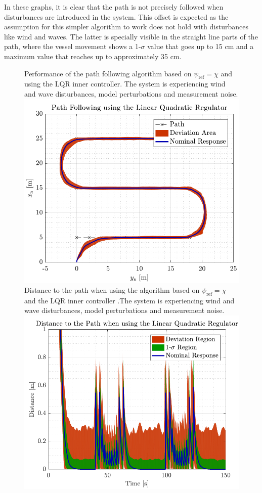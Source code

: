 In these graphs, it is clear that the path is not precisely followed when disturbances are introduced in the system. This offset is expected as the assumption for this simpler algorithm to work does not hold with disturbances like wind and waves. The latter is specially visible in the straight line parts of the path, where the vessel movement shows a 1-$\sigma$ value that goes up to 15 cm and a maximum value that reaches up to approximately 35 cm.
\begin{figure}[H]
	\captionbox  %
	{  
		Performance of the path following algorithm based on $\psi_\mathrm{ref}=\chi$ and using the LQR inner controller. The system is experiencing wind and wave disturbances, model perturbations and measurement noise.\label{fig:lqrwrong}                                
	}                                                                 
	{                                                                  
		\includegraphics[width=.45\textwidth]{figures/path_lqr_no_correc}         
	}                                                                    
	\hspace{5pt}                                                  
	\captionbox
	{       
		Distance to the path when using the algorithm based on $\psi_\mathrm{ref}=\chi$ and the LQR inner controller .The system is experiencing wind and wave disturbances, model perturbations and measurement noise.
		\label{fig:distlqrwrong}                               
	}                                                                  
	{                                                                    
		\includegraphics[width=.45\textwidth]{figures/dist_lqr_no_correc}         
	}                                                                         
\end{figure}
